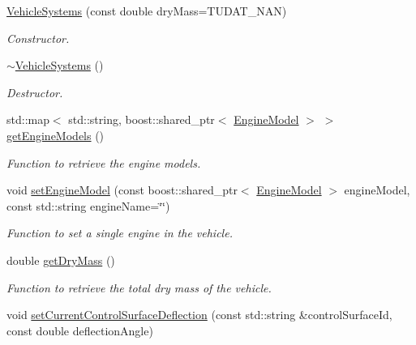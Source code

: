 \begin{DoxyCompactItemize}
\item 
\hyperlink{classtudat_1_1system__models_1_1VehicleSystems_a784bfb562166238a1b85f2825ace7145}{Vehicle\+Systems} (const double dry\+Mass=T\+U\+D\+A\+T\+\_\+\+N\+AN)
\begin{DoxyCompactList}\small\item\em Constructor. \end{DoxyCompactList}\item 
\hyperlink{classtudat_1_1system__models_1_1VehicleSystems_aab806f1b17f94930edf161990897f171}{$\sim$\+Vehicle\+Systems} ()\hypertarget{classtudat_1_1system__models_1_1VehicleSystems_aab806f1b17f94930edf161990897f171}{}\label{classtudat_1_1system__models_1_1VehicleSystems_aab806f1b17f94930edf161990897f171}

\begin{DoxyCompactList}\small\item\em Destructor. \end{DoxyCompactList}\item 
std\+::map$<$ std\+::string, boost\+::shared\+\_\+ptr$<$ \hyperlink{classtudat_1_1system__models_1_1EngineModel}{Engine\+Model} $>$ $>$ \hyperlink{classtudat_1_1system__models_1_1VehicleSystems_a4460e33e2458d497713386eeb71a8d76}{get\+Engine\+Models} ()
\begin{DoxyCompactList}\small\item\em Function to retrieve the engine models. \end{DoxyCompactList}\item 
void \hyperlink{classtudat_1_1system__models_1_1VehicleSystems_a5a478d0d03a313c63c2afadb45813802}{set\+Engine\+Model} (const boost\+::shared\+\_\+ptr$<$ \hyperlink{classtudat_1_1system__models_1_1EngineModel}{Engine\+Model} $>$ engine\+Model, const std\+::string engine\+Name=\char`\"{}\char`\"{})
\begin{DoxyCompactList}\small\item\em Function to set a single engine in the vehicle. \end{DoxyCompactList}\item 
double \hyperlink{classtudat_1_1system__models_1_1VehicleSystems_aba36aa4e54902724f789a50c9329a77a}{get\+Dry\+Mass} ()
\begin{DoxyCompactList}\small\item\em Function to retrieve the total dry mass of the vehicle. \end{DoxyCompactList}\item 
void \hyperlink{classtudat_1_1system__models_1_1VehicleSystems_aa7e18ba2906694277ccd5e5206fd7f8e}{set\+Current\+Control\+Surface\+Deflection} (const std\+::string \&control\+Surface\+Id, const double deflection\+Angle)

\end{DoxyCompactItemize}
